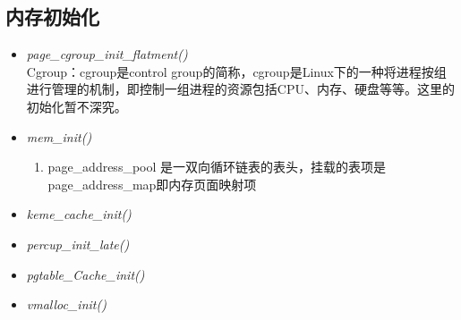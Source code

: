     \subsection{内存初始化}
    	\begin{itemize}
    		\item \emph{page\_cgroup\_init\_flatment()}\\
    			Cgroup：cgroup是control group的简称，cgroup是Linux下的一种将进程按组进行管理的机制，即控制一组进程的资源包括CPU、内存、硬盘等等。这里的初始化暂不深究。
    		\item \emph{mem\_init()}\\
    			\begin{enumerate}
    				\item page\_address\_pool 是一双向循环链表的表头，挂载的表项是page\_address\_map即内存页面映射项
    			\end{enumerate}
    		\item \emph{keme\_cache\_init()}
    		\item \emph{percup\_init\_late()}
    		\item \emph{pgtable\_Cache\_init()}
    		\item \emph{vmalloc\_init()}
    	\end{itemize}
